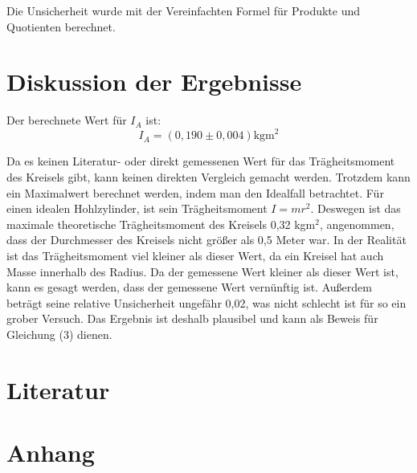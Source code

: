 \documentclass[11pt,a4paper]{article} %
\begin{document}
Die Unsicherheit wurde mit der Vereinfachten Formel für Produkte und Quotienten berechnet. 
\section{Diskussion der Ergebnisse}
Der berechnete Wert für $I_A$ ist:
$$I_A = (0,190 \pm 0,004) \textrm{kgm}^2$$

Da es keinen Literatur- oder direkt gemessenen Wert für das Trägheitsmoment des Kreisels gibt, kann keinen direkten Vergleich gemacht werden. Trotzdem kann ein Maximalwert berechnet werden, indem man den Idealfall betrachtet. Für einen idealen Hohlzylinder, ist sein Trägheitsmoment $I = mr^2$. Deswegen ist das maximale theoretische Trägheitsmoment des Kreisels 0,32 kgm$^2$, angenommen, dass der Durchmesser des Kreisels nicht größer als 0,5 Meter war. In der Realität ist das Trägheitsmoment viel kleiner als dieser Wert, da ein Kreisel hat auch Masse innerhalb des Radius. Da der gemessene Wert kleiner als dieser Wert ist, kann es gesagt werden, dass der gemessene Wert vernünftig ist. Außerdem beträgt seine relative Unsicherheit ungefähr 0,02, was nicht schlecht ist für so ein grober Versuch. Das Ergebnis ist deshalb plausibel und kann als Beweis für Gleichung (3) dienen. 
\section{Literatur}

\section{Anhang}
\end{document}
